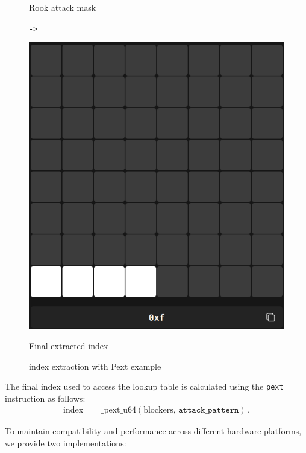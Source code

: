 \begin{figure}
\begin{minipage}[c]{0.3\textwidth}
        \caption{Rook attack mask}
    \end{minipage}
    \hfill
    \begin{minipage}[c]{0.05\textwidth}
        \centering
        \Huge\texttt{->}
    \end{minipage}
    \hfill
    \begin{minipage}[c]{0.3\textwidth}
        \centering
        \includegraphics[width=\textwidth]{Imagenes/pext_final_index.png}
        \caption{Final extracted index}
    \end{minipage}
    \caption{index extraction with Pext example}\label{fig:pext_bitboards}
\end{figure}

\noindent The final index used to access the lookup table is calculated using the \texttt{pext} instruction as follows:
\begin{align*}
    \text{index}
    &= \text{\_pext\_u64}(\text{blockers},\,\texttt{attack\_pattern})\,.
\end{align*}

\noindent To maintain compatibility and performance across different hardware platforms, we provide two implementations:

